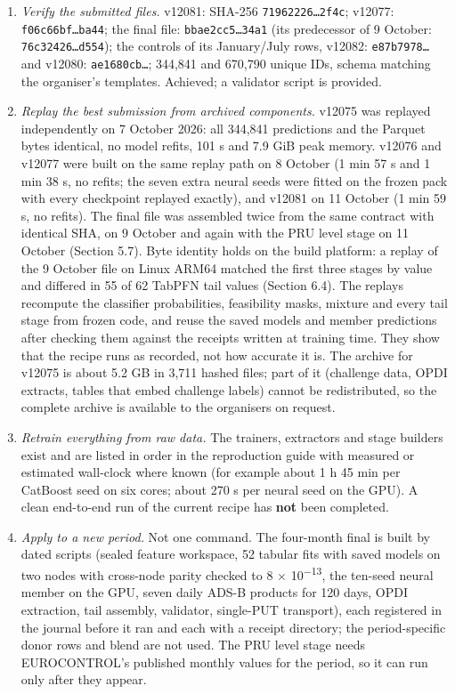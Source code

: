 \documentclass[11pt,a4paper]{article}
\providecommand{\tightlist}{\setlength{\itemsep}{0pt}\setlength{\parskip}{0pt}}
\begin{document}
\begin{enumerate}
\def\labelenumi{\arabic{enumi}.}
\tightlist
\item
  \emph{Verify the submitted files.} v12081: SHA-256 \texttt{71962226\ldots{}2f4c}; v12077: \texttt{f06c66bf\ldots{}ba44}; the final file: \texttt{bbae2cc5\ldots{}34a1} (its predecessor of 9 October: \texttt{76c32426\ldots{}d554}); the controls of its January/July rows, v12082: \texttt{e87b7978\ldots{}} and v12080: \texttt{ae1680cb\ldots{}}; 344,841 and 670,790 unique IDs, schema matching the organiser's templates. Achieved; a validator script is provided.
\item
  \emph{Replay the best submission from archived components.} v12075 was replayed independently on 7 October 2026: all 344,841 predictions and the Parquet bytes identical, no model refits, 101 s and 7.9 GiB peak memory. v12076 and v12077 were built on the same replay path on 8 October (1 min 57 s and 1 min 38 s, no refits; the seven extra neural seeds were fitted on the frozen pack with every checkpoint replayed exactly), and v12081 on 11 October (1 min 59 s, no refits). The final file was assembled twice from the same contract with identical SHA, on 9 October and again with the PRU level stage on 11 October (Section 5.7). Byte identity holds on the build platform: a replay of the 9 October file on Linux ARM64 matched the first three stages by value and differed in 55 of 62 TabPFN tail values (Section 6.4). The replays recompute the classifier probabilities, feasibility masks, mixture and every tail stage from frozen code, and reuse the saved models and member predictions after checking them against the receipts written at training time. They show that the recipe runs as recorded, not how accurate it is. The archive for v12075 is about 5.2 GB in 3,711 hashed files; part of it (challenge data, OPDI extracts, tables that embed challenge labels) cannot be redistributed, so the complete archive is available to the organisers on request.
\item
  \emph{Retrain everything from raw data.} The trainers, extractors and stage builders exist and are listed in order in the reproduction guide with measured or estimated wall-clock where known (for example about 1 h 45 min per CatBoost seed on six cores; about 270 s per neural seed on the GPU). A clean end-to-end run of the current recipe has \textbf{not} been completed.
\item
  \emph{Apply to a new period.} Not one command. The four-month final is built by dated scripts (sealed feature workspace, 52 tabular fits with saved models on two nodes with cross-node parity checked to 8 $\times$ 10\textsuperscript{$-$13}, the ten-seed neural member on the GPU, seven daily ADS-B products for 120 days, OPDI extraction, tail assembly, validator, single-PUT transport), each registered in the journal before it ran and each with a receipt directory; the period-specific donor rows and blend are not used. The PRU level stage needs EUROCONTROL's published monthly values for the period, so it can run only after they appear.
\end{enumerate}
\end{document}
